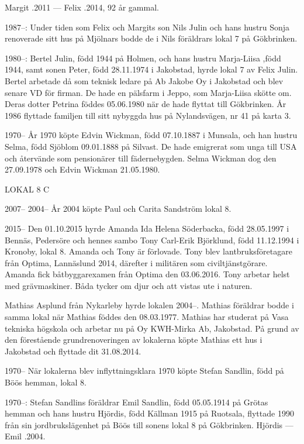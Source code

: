 Margit .2011  ---  Felix .2014, 92 år gammal.


1987--:	Under tiden som Felix och Margits son Nils Julin och hans hustru Sonja renoverade sitt hus på Mjölnars bodde de i Nils föräldrars lokal 7 på Gökbrinken.

1980--:	Bertel Julin, född 1944 på Holmen, och hans hustru Marja-Liisa ,född 1944, samt sonen Peter, född 28.11.1974 i Jakobstad, hyrde lokal 7 av Felix Julin. Bertel arbetade då som teknisk ledare på Ab Jakobe Oy i Jakobstad och blev senare VD för firman. De hade en pälsfarm i Jeppo, som Marja-Liisa skötte om. Deras dotter Petrina föddes 05.06.1980 när de hade flyttat till Gökbrinken. År 1986 flyttade familjen till sitt nybyggda hus på Nylandsvägen, nr 41 på karta 3.

 1970--
År 1970 köpte Edvin Wickman, född 07.10.1887 i Munsala, och han hustru Selma, född Sjöblom 09.01.1888 på Silvast. De hade emigrerat som unga till USA och återvände som pensionärer till fädernebygden. Selma Wickman dog den 27.09.1978 och Edvin Wickman 21.05.1980.


LOKAL 8 C

 2007--
 2004--
År 2004 köpte Paul och Carita Sandström lokal 8.

	2015--
Den 01.10.2015 hyrde Amanda Ida Helena Söderbacka, född 28.05.1997 i Bennäs, Pedersöre och hennes sambo Tony Carl-Erik Björklund, född 11.12.1994 i Kronoby, lokal 8. Amanda och Tony är förlovade. Tony blev lantbruksföretagare från Optima, Lannäslund 2014, därefter i militären som civiltjänstgörare. Amanda fick båtbyggarexamen från Optima den 03.06.2016. Tony arbetar helst med grävmaskiner. Båda tycker om djur och att vistas ute i naturen.

Mathias Asplund från Nykarleby hyrde lokalen 2004--. Mathias föräldrar bodde i samma lokal när Mathias föddes den 08.03.1977. Mathias har studerat på Vasa tekniska högskola och arbetar nu på Oy KWH-Mirka Ab, Jakobstad. På grund av den förestående grundrenoveringen av lokalerna köpte Mathias ett hus i Jakobstad och flyttade dit 31.08.2014.

 1970--
När lokalerna blev inflyttningsklara 1970 köpte Stefan Sandlin, född på Böös hemman, lokal 8.

1970--:	Stefan Sandlins föräldrar Emil Sandlin, född 05.05.1914 på Grötas hemman och hans hustru Hjördis, född  Källman 1915 på Ruotsala, flyttade 1990 från sin jordbrukslägenhet på Böös till sonens lokal 8 på Gökbrinken.
Hjördis   ---  Emil .2004.

